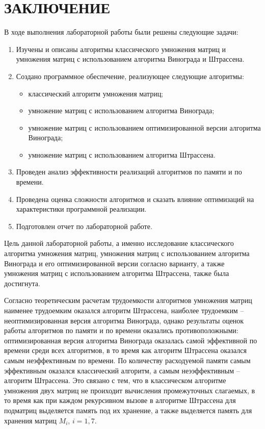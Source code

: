 \chapter*{ЗАКЛЮЧЕНИЕ}

В ходе выполнения лабораторной работы были решены следующие задачи:

\begin{enumerate}[label={\arabic*)}]
	\item Изучены и описаны алгоритмы классического умножения матриц и умножения матриц с использованием алгоритма Винограда и Штрассена.
	\item Создано программное обеспечение, реализующее следующие алгоритмы:
	\begin{itemize}[label=--]
		\item классический алгоритм умножения матриц;
		\item умножение матриц с использованием алгоритма Винограда;
		\item умножение матриц с использованием оптимизированной версии алгоритма Винограда;
		\item умножение матриц с использованием алгоритма Штрассена.
	\end{itemize}
	
	\item Проведен анализ эффективности реализаций алгоритмов по памяти и по времени.
	\item Проведена оценка сложности алгоритмов и сказать влияние оптимизаций на характеристики программной реализации.
	\item Подготовлен отчет по лабораторной работе.
\end{enumerate}

Цель данной лабораторной работы, а именно исследование классического алгоритма умножения матриц, умножения матриц с использованием алгоритма Винограда и его оптимизированной версии согласно варианту, а также умножения матриц с использованием алгоритма Штрассена, также была достигнута.

Согласно теоретическим расчетам трудоемкости алгоритмов умножения матриц наименее трудоемким оказался алгоритм Штрассена, наиболее трудоемким -- неоптимизированная версия алгоритма Винограда, однако результаты оценок работы алгоритмов по памяти и по времени оказались противоположными: оптимизированная версия алгоритма Винограда оказалась самой эффективной по времени среди всех алгоритмов, в то время как алгоритм Штрассена оказался самым неэффективным по времени. По количеству расходуемой памяти самым эффективным оказался классический алгоритм, а самым неээффективным -- алгоритм Штрассена. Это связано с тем, что в классическом алгоритме умножения двух матриц не проиходит вычисления промежуточных слагаемых, в то время как при каждом рекурсивном вызове в алгоритме Штрассена для подматриц выделяется память под их хранение, а также выделяется память для хранения матриц $M_i$, $i = \overline{1, 7}$.

